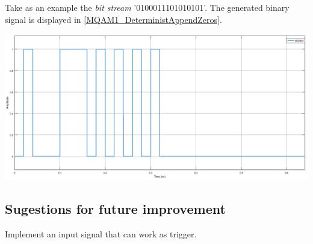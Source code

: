\documentclass[a4paper]{article}
\begin{document}
Take as an example the \textit{bit stream} '0100011101010101'. The generated binary signal is displayed in \ref{MQAM1_DeterministAppendZeros}.

\begin{center}
	\includegraphics[width=\textwidth]{MQAM1_DeterministAppendZeros}
	\label{MQAM1_DeterministAppendZeros}
\end{center}

\subsection*{Sugestions for future improvement}

Implement an input signal that can work as trigger.
\end{document}
